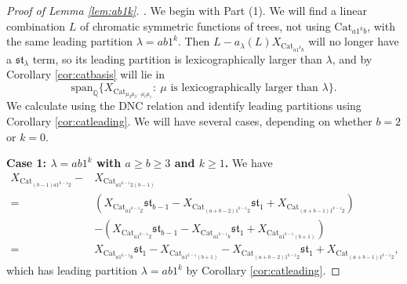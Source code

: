 \documentclass[12pt]{amsart}  %
\theoremstyle{definition}
\theoremstyle{remark}
\numberwithin{equation}{section}
\begin{document}
\begin{proof}[Proof of Lemma \ref{lem:ab1k}. ]
We begin with Part (1). We will find a linear combination $L$ of chromatic symmetric functions of trees, not using $\text{Cat}_{a1^kb}$, with the same leading partition $\lambda=ab1^k$. Then $L-a_\lambda(L)X_{\text{Cat}_{a1^kb}}$ will no longer have a $\mathfrak{st}_\lambda$ term, so its leading partition is lexicographically larger than $\lambda$, and by Corollary \ref{cor:catbasis} will lie in \begin{equation}\text{span}_{\mathbb Q}\{X_{\text{Cat}_{\mu_2\mu_3\cdots\mu_\ell\mu_1}}: \ \mu\text{ is lexicographically larger than }\lambda\}.\end{equation}
We calculate using the DNC relation and identify leading partitions using Corollary \ref{cor:catleading}. We will have several cases, depending on whether $b=2$ or $k=0$.

\textbf{Case 1: $\lambda=ab1^k$ with $a\geq b\geq 3$ and $k\geq 1$. } We have
\begin{align*}
X_{\text{Cat}_{(b-1)a1^{k-1}2}}-&X_{\text{Cat}_{a1^{k-1}2(b-1)}}\\=&(X_{\text{Cat}_{a1^{k-1}2}}\mathfrak{st}_{b-1}-X_{\text{Cat}_{(a+b-2)1^{k-1}2}}\mathfrak{st}_1+X_{\text{Cat}_{(a+b-1)1^{k-1}2}})\\&-(X_{\text{Cat}_{a1^{k-1}2}}\mathfrak{st}_{b-1}-X_{\text{Cat}_{a1^{k-1}b}}\mathfrak{st}_1+X_{\text{Cat}_{a1^{k-1}(b+1)}})\\=&X_{\text{Cat}_{a1^{k-1}b}}\mathfrak{st}_1-X_{\text{Cat}_{a1^{k-1}(b+1)}}-X_{\text{Cat}_{(a+b-2)1^{k-1}2}}\mathfrak{st}_1+X_{\text{Cat}_{(a+b-1)1^{k-1}2}},
\end{align*}
which has leading partition $\lambda=ab1^k$ by Corollary \ref{cor:catleading}.


\end{proof}
\end{document}
